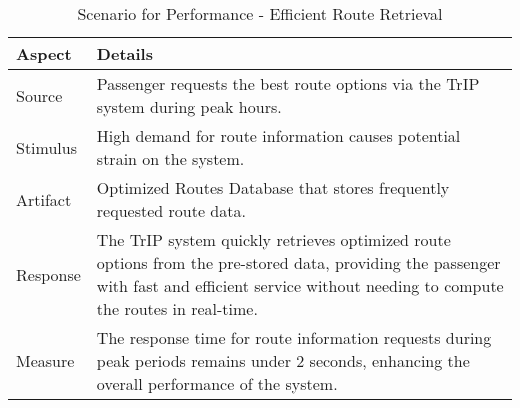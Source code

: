 \begin{table}[H]
    \centering
    \begin{tabularx}{\textwidth}{@{} lX @{}}
    \toprule
    \textbf{Aspect} & \textbf{Details} \\
    \midrule
    Source & Passenger requests the best route options via the TrIP system during peak hours. \\
    Stimulus & High demand for route information causes potential strain on the system. \\
    Artifact & Optimized Routes Database that stores frequently requested route data. \\
    Response & The TrIP system quickly retrieves optimized route options from the pre-stored data, providing the passenger with fast and efficient service without needing to compute the routes in real-time. \\
    Measure & The response time for route information requests during peak periods remains under 2 seconds, enhancing the overall performance of the system. \\
    \bottomrule
    \end{tabularx}
    \caption{Scenario for Performance - Efficient Route Retrieval}
    \label{table:performance_route_optimization}
\end{table}

